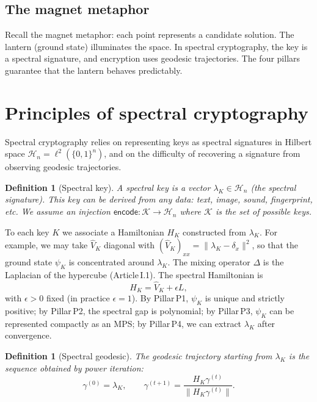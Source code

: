 \documentclass[11pt,a4paper]{article}
\newtheorem{definition}[theorem]{Definition}
\begin{document}
\subsection{The magnet metaphor}

Recall the magnet metaphor: each point represents a candidate solution. The lantern (ground state) illuminates the space. In spectral cryptography, the key is a spectral signature, and encryption uses geodesic trajectories. The four pillars guarantee that the lantern behaves predictably.

\section{Principles of spectral cryptography}

Spectral cryptography relies on representing keys as spectral signatures in Hilbert space \(\mathcal{H}_n = \ell^2(\{0,1\}^n)\), and on the difficulty of recovering a signature from observing geodesic trajectories.

\begin{definition}[Spectral key]
A spectral key is a vector \(\lambda_K \in \mathcal{H}_n\) (the spectral signature). This key can be derived from any data: text, image, sound, fingerprint, etc. We assume an injection \(\mathsf{encode} : \mathcal{K} \to \mathcal{H}_n\) where \(\mathcal{K}\) is the set of possible keys.
\end{definition}

To each key \(K\) we associate a Hamiltonian \(H_K\) constructed from \(\lambda_K\). For example, we may take \(\hat{V}_K\) diagonal with \((\hat{V}_K)_{xx} = \|\lambda_K - \delta_x\|^2\), so that the ground state \(\psi_K\) is concentrated around \(\lambda_K\). The mixing operator \(\Delta\) is the Laplacian of the hypercube (Article I.1). The spectral Hamiltonian is
\[
H_K = \hat{V}_K + \epsilon L,
\]
with \(\epsilon>0\) fixed (in practice \(\epsilon=1\)). By Pillar P1, \(\psi_K\) is unique and strictly positive; by Pillar P2, the spectral gap is polynomial; by Pillar P3, \(\psi_K\) can be represented compactly as an MPS; by Pillar P4, we can extract \(\lambda_K\) after convergence.

\begin{definition}[Spectral geodesic]
The geodesic trajectory starting from \(\lambda_K\) is the sequence obtained by power iteration:
\[
\gamma^{(0)} = \lambda_K,\qquad \gamma^{(t+1)} = \frac{H_K\gamma^{(t)}}{\|H_K\gamma^{(t)}\|}.
\]
\end{definition}
\end{document}
